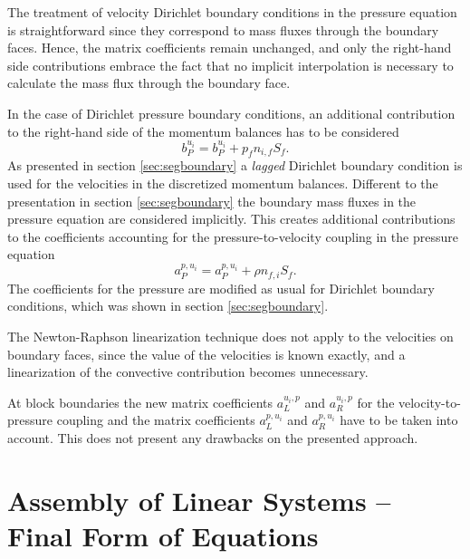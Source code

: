 The treatment of velocity Dirichlet boundary conditions in the pressure equation is straightforward since they correspond to mass fluxes through the boundary faces. Hence, the matrix coefficients remain unchanged, and only the right-hand side contributions embrace the fact that no implicit interpolation is necessary to calculate the mass flux through the boundary face.

In the case of Dirichlet pressure boundary conditions, an additional contribution to the right-hand side of the momentum balances has to be considered
\begin{displaymath}
  b_P^{u_i} = b_P^{u_i} + p_f n_{i,f} S_f.
\end{displaymath}
As presented in section \ref{sec:segboundary} a \emph{lagged} Dirichlet boundary condition is used for the velocities in the discretized momentum balances. Different to the presentation in section \ref{sec:segboundary} the boundary mass fluxes in the pressure equation are considered implicitly. This creates additional contributions to the coefficients accounting for the pressure-to-velocity coupling in the pressure equation
\begin{displaymath}
  a_P^{p,u_i} = a_P^{p,u_i} + \rho n_{f,i} S_f.
\end{displaymath}
The coefficients for the pressure are modified as usual for Dirichlet boundary conditions, which was shown in section \ref{sec:segboundary}.

The Newton-Raphson linearization technique does not apply to the velocities on boundary faces, since the value of the velocities is known exactly, and a linearization of the convective contribution becomes unnecessary.

At block boundaries the new matrix coefficients \(a_L^{u_i,p}\) and \(a_R^{u_i,p}\) for the velocity-to-pressure coupling and the matrix coefficients \(a_L^{p,u_i}\) and \(a_R^{p,u_i}\) have to be taken into account. This does not present any drawbacks on the presented approach.

\section{Assembly of Linear Systems -- Final Form of Equations}
\label{sec:cpldassembly}

